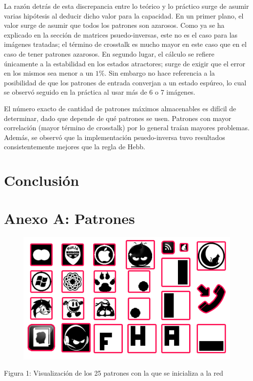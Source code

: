 \documentclass[%
    final,
    reprint,
    notitlepage,
    narroweqnarray,
    inline,
    twoside,
    invited
    ]{ieee}
\begin{document}
\par La razón detrás de esta discrepancia entre lo teórico y lo práctico surge de asumir varias hipótesis al deducir dicho valor para la capacidad. En un primer plano, el valor surge de asumir que todos los patrones son azarosos. Como ya se ha explicado en la sección de matrices psuedo-inversas, este no es el caso para las imágenes tratadas; el término de crosstalk es mucho mayor en este caso que en el caso de tener patrones azarosos. En segundo lugar, el cálculo se refiere únicamente a la estabilidad en los estados atractores; surge de exigir que el error en los mismos sea menor a un $1\%$. Sin embargo no hace referencia a la posibilidad de que los patrones de entrada converjan a un estado espúreo, lo cual se observó seguido en la práctica al usar más de 6 o 7 imágenes.\\

\par El número exacto de cantidad de patrones máximos almacenables es difícil de determinar, dado que depende de qué patrones se usen. Patrones con mayor correlación (mayor término de crosstalk) por lo general traían mayores problemas. Además, se observó que la implementación psuedo-inversa tuvo resultados consistentemente mejores que la regla de Hebb.



\section{Conclusión}






\clearpage
\onecolumn

\section*{Anexo A: Patrones}

\begin{figure}[H]
\begin{center}
\includegraphics[scale=0.70]{./images/patterns.png}
\label{modelado}
\end{center}
\end{figure}

\begin{center}
\par Figura 1: Visualización de los 25 patrones con la que se inicializa a la red
\end{center}



\end{document}
